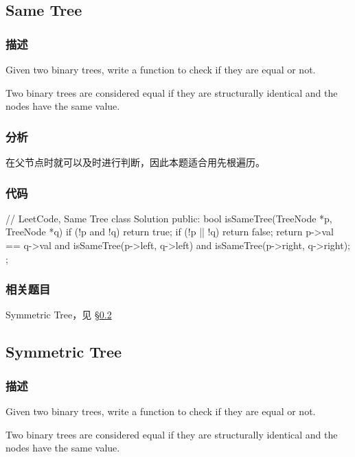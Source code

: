\subsection{Same Tree}
\label{sec:same-tree}


\subsubsection{描述}
Given two binary trees, write a function to check if they are equal or not.

Two binary trees are considered equal if they are structurally identical and the nodes have the same value.


\subsubsection{分析}
在父节点时就可以及时进行判断，因此本题适合用先根遍历。


\subsubsection{代码}

\begin{Code}
// LeetCode, Same Tree
class Solution {
public:
    bool isSameTree(TreeNode *p, TreeNode *q) {
        if (!p and !q) return true;
        if (!p || !q) return false;
        return p->val == q->val
                and isSameTree(p->left, q->left)
                and isSameTree(p->right, q->right);
    }
};
\end{Code}


\subsubsection{相关题目}
\begindot
\item Symmetric Tree，见 \S \ref{sec:symmetric-tree}
\myenddot


\subsection{Symmetric Tree}
\label{sec:symmetric-tree}


\subsubsection{描述}
Given two binary trees, write a function to check if they are equal or not.

Two binary trees are considered equal if they are structurally identical and the nodes have the same value.


